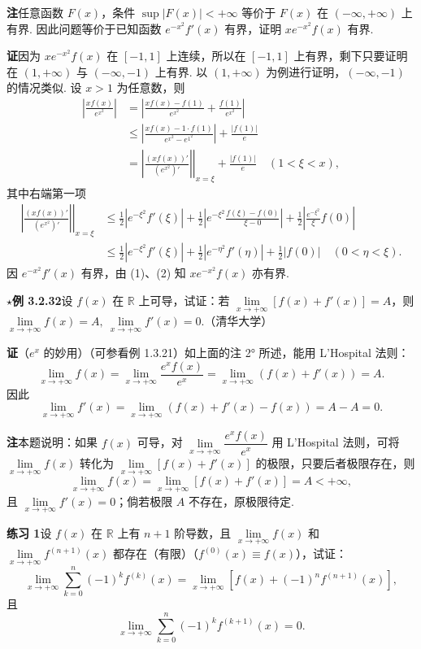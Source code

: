 \documentclass[UTF8, 12pt, fontset=fandol, oneside]{ctexart}
\begin{document}
\noindent\textbf{注}\quad 任意函数 $F(x)$，条件 $\sup |F(x)|<+\infty$ 等价于 $F(x)$ 在 $(-\infty,+\infty)$ 上有界. 因此问题等价于已知函数 $e^{-x^2}f'(x)$ 有界，证明 $xe^{-x^2}f(x)$ 有界.

\noindent\textbf{证}\quad 因为 $xe^{-x^2}f(x)$ 在 $[-1,1]$ 上连续，所以在 $[-1,1]$ 上有界，剩下只要证明在 $(1,+\infty)$ 与 $(-\infty,-1)$ 上有界. 以 $(1,+\infty)$ 为例进行证明，$(-\infty,-1)$ 的情况类似. 设 $x>1$ 为任意数，则
\[
\begin{aligned}
  \left|\frac{xf(x)}{e^{x^2}}\right|
  &=
  \left|\frac{xf(x)-f(1)}{e^{x^2}}+\frac{f(1)}{e^{x^2}}\right|  \\
  &\le
  \left|\frac{xf(x)-1\cdot f(1)}{e^{x^2}-e^{1^2}}\right|+\frac{|f(1)|}{e}  \\
  &=
  \left.\left|\frac{(xf(x))'}{(e^{x^2})'}\right|\right|_{x=\xi}+\frac{|f(1)|}{e}
  \quad(1<\xi<x),
\end{aligned}
\tag{1}
\]
其中右端第一项
\[
\begin{aligned}
  \left.\left|\frac{(xf(x))'}{(e^{x^2})'}\right|\right|_{x=\xi}
  &\le \frac12|e^{-\xi^2}f'(\xi)|
  +\frac12\left|e^{-\xi^2}\frac{f(\xi)-f(0)}{\xi-0}\right|
  +\frac12\left|\frac{e^{-\xi^2}}{\xi}f(0)\right| \\
  &\le \frac12|e^{-\xi^2}f'(\xi)|
  +\frac12|e^{-\eta^2}f'(\eta)|+\frac12|f(0)|
  \quad(0<\eta<\xi).
\end{aligned}
\tag{2}
\]
因 $e^{-x^2}f'(x)$ 有界，由 (1)、(2) 知 $xe^{-x^2}f(x)$ 亦有界.

\noindent\textbf{$\star$例 3.2.32}\quad 设 $f(x)$ 在 $\mathbb{R}$ 上可导，试证：若 $\lim\limits_{x\to+\infty}[f(x)+f'(x)]=A$，则 $\lim\limits_{x\to+\infty}f(x)=A,\ \lim\limits_{x\to+\infty}f'(x)=0$.（清华大学）

\noindent\textbf{证}\quad （$e^x$ 的妙用）（可参看例 1.3.21）如上面的注 2° 所述，能用 L'Hospital 法则：
\[
  \lim_{x\to+\infty}f(x)
  =
  \lim_{x\to+\infty}\frac{e^xf(x)}{e^x}
  =
  \lim_{x\to+\infty}(f(x)+f'(x))=A.
\]
因此
\[
  \lim_{x\to+\infty}f'(x)
  =
  \lim_{x\to+\infty}(f(x)+f'(x)-f(x))=A-A=0.
\]

\noindent\textbf{注}\quad 本题说明：如果 $f(x)$ 可导，对 $\lim\limits_{x\to+\infty}\dfrac{e^xf(x)}{e^x}$ 用 L'Hospital 法则，可将 $\lim\limits_{x\to+\infty}f(x)$ 转化为 $\lim\limits_{x\to+\infty}[f(x)+f'(x)]$ 的极限，只要后者极限存在，则
\[
  \lim_{x\to+\infty}f(x)=\lim_{x\to+\infty}[f(x)+f'(x)]=A<+\infty,
\]
且 $\lim\limits_{x\to+\infty}f'(x)=0$；倘若极限 $A$ 不存在，原极限待定.

\noindent\textbf{练习 1}\quad 设 $f(x)$ 在 $\mathbb{R}$ 上有 $n+1$ 阶导数，且 $\lim\limits_{x\to+\infty}f(x)$ 和 $\lim\limits_{x\to+\infty}f^{(n+1)}(x)$ 都存在（有限）（$f^{(0)}(x)\equiv f(x)$），试证：
\[
  \lim_{x\to+\infty}\sum_{k=0}^{n}(-1)^kf^{(k)}(x)
  =
  \lim_{x\to+\infty}[f(x)+(-1)^nf^{(n+1)}(x)],
\]
且
\[
  \lim_{x\to+\infty}\sum_{k=0}^{n}(-1)^kf^{(k+1)}(x)=0.
\]
\end{document}
